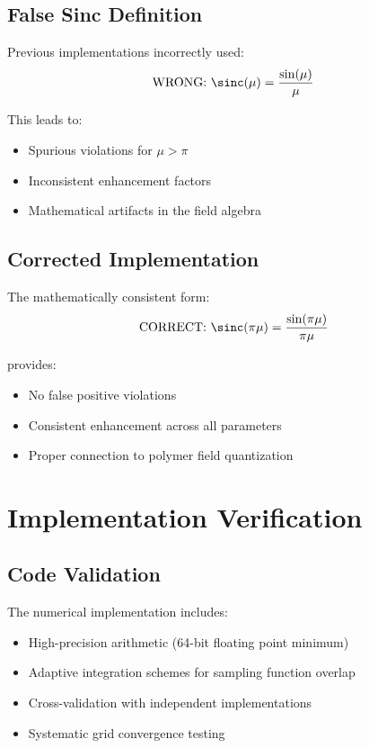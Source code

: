 \documentclass[11pt,a4paper]{article}
\begin{document}
\subsection{False Sinc Definition}

Previous implementations incorrectly used:
\begin{equation}
\text{WRONG: } \sinc(\mu) = \frac{\sin(\mu)}{\mu}
\end{equation}

This leads to:
\begin{itemize}
\item Spurious violations for $\mu > \pi$ 
\item Inconsistent enhancement factors
\item Mathematical artifacts in the field algebra
\end{itemize}

\subsection{Corrected Implementation}

The mathematically consistent form:
\begin{equation}
\text{CORRECT: } \sinc(\pi\mu) = \frac{\sin(\pi\mu)}{\pi\mu}  
\end{equation}

provides:
\begin{itemize}
\item No false positive violations
\item Consistent enhancement across all parameters
\item Proper connection to polymer field quantization
\end{itemize}

\section{Implementation Verification}

\subsection{Code Validation}

The numerical implementation includes:
\begin{itemize}
\item High-precision arithmetic (64-bit floating point minimum)
\item Adaptive integration schemes for sampling function overlap
\item Cross-validation with independent implementations
\item Systematic grid convergence testing
\end{itemize}
\end{document}
